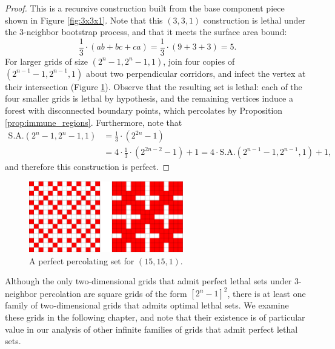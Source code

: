 \begin{proof}
This is a recursive construction built from the base component piece shown in Figure \ref{fig:3x3x1}. Note that this $(3,3,1)$ construction is lethal under the 3-neighbor bootstrap process, and that it meets the surface area bound:
$$\frac{1}{3} \cdot (ab+bc+ca) = \frac{1}{3} \cdot (9 + 3 + 3) = 5.$$
For larger grids of size $(2^n-1, 2^n-1, 1)$, join four copies of $(2^{n-1}-1, 2^{n-1}, 1)$ about two perpendicular corridors, and infect the vertex at their intersection (Figure \ref{fig:15x15x1}). Observe that the resulting set is lethal: each of the four smaller grids is lethal by hypothesis, and the remaining vertices induce a forest with disconnected boundary points, which percolates by Proposition \ref{prop:immune_regions}. Furthermore, note that
\begin{align*}
\text{S.A.}(2^n-1,2^n-1,1) &= \frac{1}{3} \cdot (2^{2n}-1) \\
&= 4 \cdot \frac{1}{3} \cdot (2^{2n-2} -1) + 1 = 4 \cdot \text{S.A.}(2^{n-1}-1, 2^{n-1}, 1) + 1,
\end{align*}
and therefore this construction is perfect.
\end{proof}

\begin{figure}[]
\centering
\includegraphics[width=0.6\textwidth]{figures/7/15x15x1.pdf}
\caption{A perfect percolating set for $(15,15,1)$.}
\label{fig:15x15x1}
\end{figure} 

Although the only two-dimensional grids that admit perfect lethal sets under 3-neighbor percolation are square grids of the form $[2^n-1]^2$, there is at least one family of two-dimensional grids that admits optimal lethal sets. We examine these grids in the following chapter, and note that their existence is of particular value in our analysis of other infinite families of grids that admit perfect lethal sets. 

